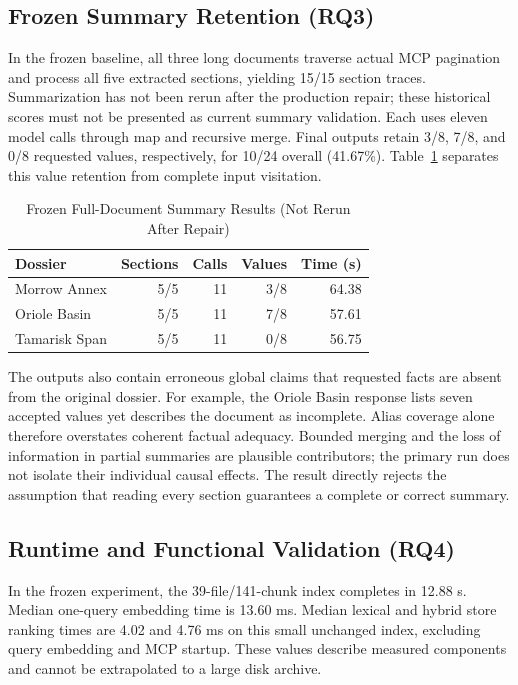 \documentclass[conference,letterpaper]{IEEEtran}
\begin{document}
\subsection{Frozen Summary Retention (RQ3)}
In the frozen baseline, all three long documents traverse actual MCP pagination and process all five extracted sections, yielding 15/15 section traces. Summarization has not been rerun after the production repair; these historical scores must not be presented as current summary validation. Each uses eleven model calls through map and recursive merge. Final outputs retain 3/8, 7/8, and 0/8 requested values, respectively, for 10/24 overall (41.67\%). Table~\ref{tab:summaries} separates this value retention from complete input visitation.

\begin{table}[t]
\caption{Frozen Full-Document Summary Results (Not Rerun After Repair)}
\label{tab:summaries}
\centering\small
\begin{tabular}{@{}lrrrr@{}}
\toprule
Dossier & Sections & Calls & Values & Time (s) \\
\midrule
Morrow Annex & 5/5 & 11 & 3/8 & 64.38 \\
Oriole Basin & 5/5 & 11 & 7/8 & 57.61 \\
Tamarisk Span & 5/5 & 11 & 0/8 & 56.75 \\
\bottomrule
\end{tabular}
\end{table}

The outputs also contain erroneous global claims that requested facts are absent from the original dossier. For example, the Oriole Basin response lists seven accepted values yet describes the document as incomplete. Alias coverage alone therefore overstates coherent factual adequacy. Bounded merging and the loss of information in partial summaries are plausible contributors; the primary run does not isolate their individual causal effects. The result directly rejects the assumption that reading every section guarantees a complete or correct summary.

\subsection{Runtime and Functional Validation (RQ4)}
In the frozen experiment, the 39-file/141-chunk index completes in 12.88 s. Median one-query embedding time is 13.60 ms. Median lexical and hybrid store ranking times are 4.02 and 4.76 ms on this small unchanged index, excluding query embedding and MCP startup. These values describe measured components and cannot be extrapolated to a large disk archive.
\end{document}
